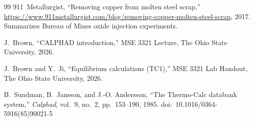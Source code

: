 \documentclass[11pt]{article}
\begin{document}
\begin{thebibliography}{99}
911~Metallurgist,
``Removing copper from molten steel scrap,''
\url{https://www.911metallurgist.com/blog/removing-copper-molten-steel-scrap}, 2017.
Summarizes Bureau of Mines oxide injection experiments.

J.~Brown,
``CALPHAD introduction,''
MSE 3321 Lecture, The Ohio State University, 2026.

J.~Brown and Y.~Ji,
``Equilibrium calculations (TC1),''
MSE 3321 Lab Handout, The Ohio State University, 2026.

B.~Sundman, B.~Jansson, and J.-O. Andersson,
``The Thermo-Calc databank system,''
\textit{Calphad}, vol.~9, no.~2, pp.~153--190, 1985.
doi:~10.1016/0364-5916(85)90021-5

\end{thebibliography}
\end{document}
